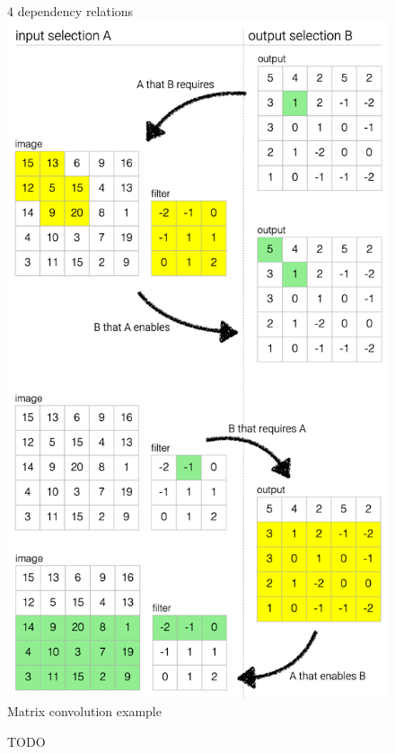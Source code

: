 \begin{figure}
   \subcaptionbox
      {4 dependency relations}
      {\includegraphics[scale=0.4]{fig/example/4-relations.png}}
   \subcaptionbox
      {Matrix convolution example}
      {
         \small
         
         
      }
   \caption{TODO}
\end{figure}
